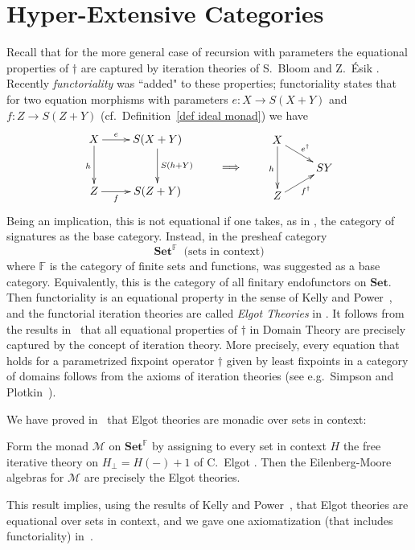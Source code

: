 \documentclass{LMCS}
\theoremstyle{plain}
\theoremstyle{definition}
\numberwithin{equation}{section}
\begin{document}
\section{Hyper-Extensive Categories}
Recall that for the more general case of recursion with parameters the equational properties of $\dagger$ are captured by iteration theories of S.~Bloom and Z.~\'{E}sik \cite{be}. Recently \emph{functoriality} was ``added" to these properties; functoriality states that for two equation morphisms with parameters $e: X \to S(X+Y)$ and $f: Z \to S(Z+Y)$ (cf.~Definition~\ref{def ideal monad}) we have
\[
\vcenter{
  \xymatrix@R-1pc{
    X \ar[r]^-e \ar[dd]_h
    &
    S(X+Y)
    \ar[dd]^{S(h+Y)}
    \\ \\
    Z \ar[r]_-f
    &
    S(Z+Y)
    }
  }
  \qquad\Longrightarrow\qquad
  \vcenter{
    \xymatrix@R-1pc{
      X \ar[rd]^{e^\dagger} \ar[dd]_h
      \\
      & SY
      \\
      Z\ar[ru]_{f^\dagger}
      }
    }
\]
Being an implication, this is not equational if one takes, as in \cite{be}, the category of signatures as the base category. Instead, in \cite{amv_em2} the presheaf category
$$\mathbf{Set}^\mathbb{F}\ \text{ (sets in context)}$$
where $\mathbb F$ is the category of finite sets and functions, was
suggested as a base category. Equivalently, this is the category of
all finitary endofunctors on $\mathbf{Set}$.  Then functoriality is an
equational property in the sense of Kelly and Power~\cite{kp93}, and the functorial iteration theories are called {\it Elgot Theories} in \cite{amv_em2}. It follows from the results
in~\cite{be} that all equational properties of $\dagger$ in Domain
Theory are precisely captured by the concept of iteration theory.  More precisely, every equation that holds for a parametrized fixpoint operator $\dagger$ given by least fixpoints in a category of domains follows from the axioms of iteration theories (see e.g.~Simpson and Plotkin~\cite{sp00}). 

We have proved in~\cite{amv_em2} that Elgot theories are monadic over sets in context:
\begin{thm}\label{eilenberg-moore alg for M=elgot theo}
 Form the monad $\mathcal M$ on $\mathbf{Set}^\mathbb F$ by assigning to every set in context $H$ the free iterative theory on $H_\bot=H(-)+1$ of C.~Elgot \cite{elgot}. Then the Eilenberg-Moore algebras for  $\mathcal M$ are precisely the  Elgot theories.
\end{thm}
This result implies, using the results of Kelly and Power~\cite{kp93}, that Elgot theories are equational over sets in context, and we gave one axiomatization (that includes functoriality) in~\cite{amv_em2}. 
\end{document}
